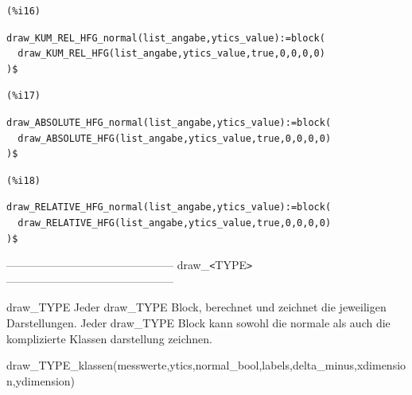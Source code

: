 \documentclass[12pt]{article}
\begin{document}
\noindent
\begin{minipage}[t]{8ex}{\color{red}\bf
\begin{verbatim}
(%i16) 
\end{verbatim}}
\end{minipage}
\begin{minipage}[t]{\textwidth}{\color{blue}
\begin{verbatim}
draw_KUM_REL_HFG_normal(list_angabe,ytics_value):=block(
  draw_KUM_REL_HFG(list_angabe,ytics_value,true,0,0,0,0)
)$
\end{verbatim}}
\end{minipage}


\noindent
\begin{minipage}[t]{8ex}{\color{red}\bf
\begin{verbatim}
(%i17) 
\end{verbatim}}
\end{minipage}
\begin{minipage}[t]{\textwidth}{\color{blue}
\begin{verbatim}
draw_ABSOLUTE_HFG_normal(list_angabe,ytics_value):=block(
  draw_ABSOLUTE_HFG(list_angabe,ytics_value,true,0,0,0,0)
)$
\end{verbatim}}
\end{minipage}


\noindent
\begin{minipage}[t]{8ex}{\color{red}\bf
\begin{verbatim}
(%i18) 
\end{verbatim}}
\end{minipage}
\begin{minipage}[t]{\textwidth}{\color{blue}
\begin{verbatim}
draw_RELATIVE_HFG_normal(list_angabe,ytics_value):=block(
  draw_RELATIVE_HFG(list_angabe,ytics_value,true,0,0,0,0)
)$
\end{verbatim}}
\end{minipage}

--------------------------------------------- draw\_\verb|<|TYPE\verb|>| ---------------------------------------------

draw\_TYPE
    Jeder draw\_TYPE Block, berechnet und zeichnet die jeweiligen Darstellungen. 
    Jeder draw\_TYPE Block kann sowohl die normale als auch die komplizierte Klassen darstellung zeichnen.

draw\_TYPE\_klassen(messwerte,ytics,normal\_bool,labels,delta\_minus,xdimension,ydimension)
\end{document}
